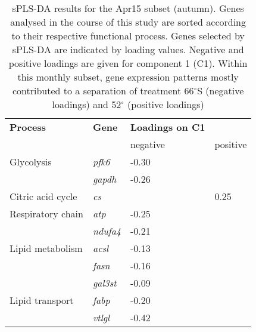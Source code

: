 \begin{table}[]
\caption{sPLS-DA results for the Apr15 subset (autumn). Genes analysed in the
        course of this study are sorted according to their respective
        functional process. Genes selected by sPLS-DA are indicated by loading
        values. Negative and positive loadings are given for component 1 (C1).
        Within this monthly subset, gene expression patterns mostly contributed
        to a separation of treatment 66$^{\circ}$S (negative loadings) and
        52$^{\circ}$ (positive loadings)}
\label{pub3_tab4}
\begin{tabular}{@{}llll@{}}
\toprule
\textbf{Process}                      & \textbf{Gene}   & \textbf{Loadings on C1}       &          \\
                                      &                 & negative                      & positive \\ \midrule
Glycolysis                            & \textit{pfk6}   & \cellcolor[HTML]{EFEFEF}-0.30 &          \\
                                      & \textit{gapdh}  & \cellcolor[HTML]{EFEFEF}-0.26 &          \\
Citric acid cycle                     & \textit{cs}     & \cellcolor[HTML]{EFEFEF}      & 0.25     \\
Respiratory chain                     & \textit{atp}    & \cellcolor[HTML]{EFEFEF}-0.25 &          \\
                                      & \textit{ndufa4} & \cellcolor[HTML]{EFEFEF}-0.21 &          \\
Lipid metabolism                      & \textit{acsl}   & \cellcolor[HTML]{EFEFEF}-0.13 &          \\
                                      & \textit{fasn}   & \cellcolor[HTML]{EFEFEF}-0.16 &          \\
                                      & \textit{gal3st} & \cellcolor[HTML]{EFEFEF}-0.09 &          \\
Lipid transport                       & \textit{fabp}   & \cellcolor[HTML]{EFEFEF}-0.20 &          \\
                                      & \textit{vtlgl}  & \cellcolor[HTML]{EFEFEF}-0.42 &          \\

\end{tabular}
\end{table}
